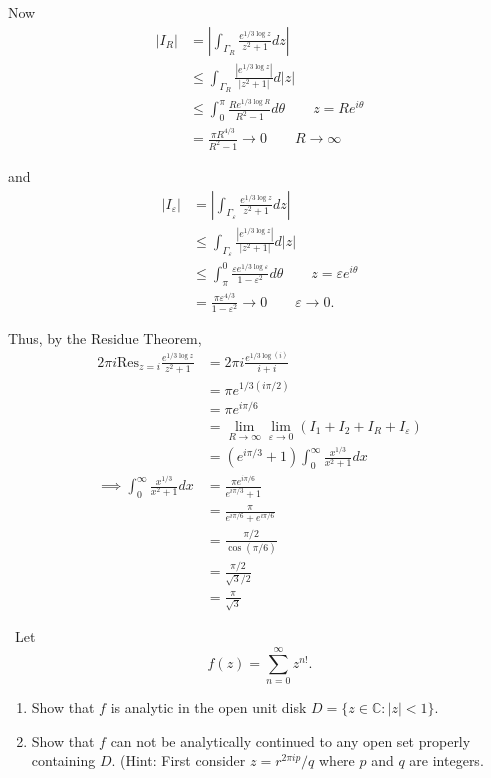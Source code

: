 \documentclass[12pt]{Homework}
\newcommand{\res}{\text{Res}}
\begin{document}
\begin{solution}
Now \begin{align*}
    |I_R|&=\left|\int_{\Gamma_R}\frac{e^{1/3\log z}}{z^2+1}dz\right|\\
    &\le \int_{\Gamma_R}\frac{|e^{1/3\log z}|}{|z^2+1|}d|z|\\
    &\le \int_0^\pi\frac{Re^{1/3\log R}}{R^2-1}d\theta\qquad z=Re^{i\theta}\\
    &=\frac{\pi R^{4/3}}{R^2-1}\to0\qquad R\to\infty
\end{align*}

and \begin{align*}
    |I_\varepsilon|&=\left|\int_{\Gamma_\varepsilon}\frac{e^{1/3\log z}}{z^2+1}dz\right|\\
    &\le \int_{\Gamma_\varepsilon}\frac{|e^{1/3\log z}|}{|z^2+1|}d|z|\\
    &\le \int_\pi^0\frac{\varepsilon e^{1/3\log \varepsilon}}{1-\varepsilon^2}d\theta\qquad z=\varepsilon e^{i\theta}\\
    &=\frac{\pi \varepsilon^{4/3}}{1-\varepsilon^2}\to0\qquad \varepsilon\to0.
\end{align*}

Thus, by the Residue Theorem, \begin{align*}
    2\pi i\res_{z=i}\frac{e^{1/3\log z}}{z^2+1}&=2\pi i\frac{e^{1/3\log (i)}}{i+i}\\
    &=\pi e^{1/3(i\pi/2)}\\
    &=\pi e^{i\pi/6}\\
    &=\lim_{R\to\infty}\lim_{\varepsilon\to0}(I_1+I_2+I_R+I_\varepsilon)\\
    &=(e^{i\pi/3}+1)\int_0^\infty\frac{x^{1/3}}{x^2+1}dx\\
    \implies \int_0^\infty\frac{x^{1/3}}{x^2+1}dx&=\frac{\pi e^{i\pi/6}}{e^{i\pi/3}+1}\\
    &=\frac{\pi}{e^{i\pi/6}+e^{i\pi/6}}\\
    &=\frac{\pi/2}{\cos(\pi/6)}\\
    &=\frac{\pi/2}{\sqrt{3}/2}\\
    &=\frac{\pi}{\sqrt{3}}
\end{align*}
\end{solution}
\newpage



\begin{problem} $\,$
Let $$f(z)=\sum_{n=0}^\infty z^{n!}.$$
\begin{enumerate}[label=(\alph*)]
    \item Show that $f$ is analytic in the open unit disk $D=\{z\in\mathbb{C}:|z|<1\}.$
    \item Show that $f$ can not be analytically continued to any open set properly containing $D.$ (Hint: First consider $z=r^{2\pi ip}/q$ where $p$ and $q$ are integers.
\end{enumerate}
\end{problem}
\end{document}
